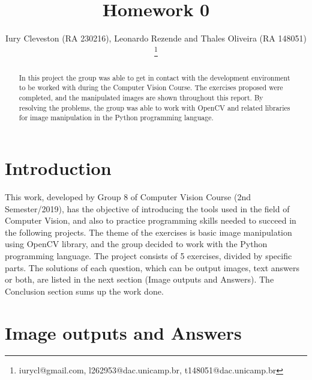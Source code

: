 \documentclass[]{IEEEtran}
\begin{document}
  \title{Homework 0}
  \author{Iury Cleveston (RA 230216), Leonardo Rezende and Thales Oliveira (RA 148051)
    \thanks{iurycl@gmail.com, l262953@dac.unicamp.br, t148051@dac.unicamp.br}
  }

  \maketitle
  
  \begin{abstract}
    In this project the group was able to get in contact with the development environment to be worked with during the Computer Vision Course. The exercises proposed were completed, and the manipulated images are shown throughout this report. By resolving the problems, the group was able to work with OpenCV and related libraries for image manipulation in the Python programming language.
  \end{abstract}
  
  \section{Introduction}
  
  This work, developed by Group 8 of Computer Vision Course (2nd Semester/2019), has the objective of introducing the tools used in the field of Computer Vision, and also to practice programming skills needed to succeed in the following projects. The theme of the exercises is basic image manipulation using OpenCV library, and the group decided to work with the Python programming language. The project consists of 5 exercises, divided by specific parts. The solutions of each question, which can be output images, text answers or both, are listed in the next section (Image outputs and Answers). The Conclusion section sums up the work done. 


  \section{Image outputs and Answers}
\end{document}

